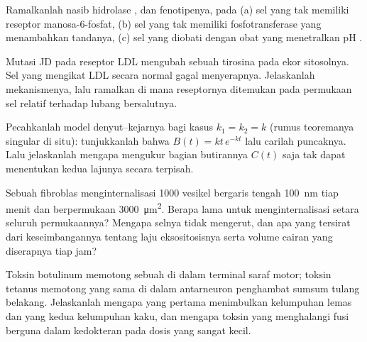 \begin{exercise}[$\star\star$]\label{exo:b3:membrane-traffic:8}
Ramalkanlah nasib hidrolase , dan fenotipenya, pada (a)
sel yang tak memiliki reseptor manosa-6-fosfat, (b) sel yang tak memiliki
fosfotransferase yang menambahkan tandanya, (c) sel yang diobati dengan
obat yang menetralkan pH .
\end{exercise}

\begin{exercise}[$\star\star$]\label{exo:b3:membrane-traffic:9}
Mutasi JD pada reseptor LDL mengubah sebuah tirosina pada ekor sitosolnya.
Sel yang mengikat LDL secara normal gagal menyerapnya. Jelaskanlah
mekanismenya, lalu ramalkan di mana reseptornya ditemukan pada permukaan sel
relatif terhadap lubang bersalutnya.
\end{exercise}

\begin{exercise}[$\star\star\star$]\label{exo:b3:membrane-traffic:10}
Pecahkanlah model denyut--kejarnya bagi kasus $k_{1} = k_{2} = k$ (rumus
teoremanya singular di situ): tunjukkanlah bahwa $B(t) = kt\,e^{-kt}$
lalu carilah puncaknya. Lalu jelaskanlah mengapa mengukur bagian butirannya
$C(t)$ saja tak dapat menentukan kedua lajunya secara terpisah.
\end{exercise}

\begin{exercise}[$\star\star\star$]\label{exo:b3:membrane-traffic:11}
Sebuah fibroblas menginternalisasi \num{1000} vesikel  bergaris tengah
\qty{100}{nm} tiap menit dan berpermukaan \qty{3000}{\micro m^2}. Berapa
lama untuk menginternalisasi setara seluruh permukaannya? Mengapa selnya tidak
mengerut, dan apa yang tersirat dari keseimbangannya tentang laju
eksositosisnya serta volume cairan yang diserapnya tiap jam?
\end{exercise}

\begin{exercise}[$\star\star\star$]\label{exo:b3:membrane-traffic:12}
Toksin botulinum memotong sebuah  di dalam terminal saraf motor; toksin
tetanus memotong  yang sama di dalam antarneuron penghambat sumsum tulang
belakang. Jelaskanlah mengapa yang pertama menimbulkan kelumpuhan lemas dan
yang kedua kelumpuhan kaku, dan mengapa toksin yang menghalangi fusi berguna
dalam kedokteran pada dosis yang sangat kecil.
\end{exercise}

